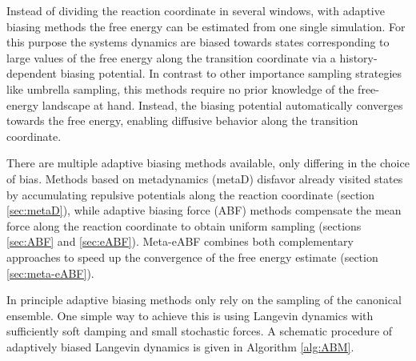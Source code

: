 Instead of dividing the reaction coordinate in several windows, with adaptive biasing methods the free energy can be estimated from one single simulation. For this purpose the systems dynamics are biased towards states corresponding to large values of the free energy along the transition coordinate via a history-dependent biasing potential. In contrast to other importance sampling strategies like umbrella sampling, this methods require no prior knowledge of the free-energy landscape at hand. Instead, the biasing potential automatically converges towards the free energy, enabling diffusive behavior along the transition coordinate.

There are multiple adaptive biasing methods available, only differing in the choice of bias. Methods based on metadynamics (metaD) disfavor already visited states by accumulating repulsive potentials along the reaction coordinate (section \ref{sec:metaD}), while adaptive biasing force (ABF) methods compensate the mean force along the reaction coordinate to obtain uniform sampling (sections \ref{sec:ABF} and \ref{sec:eABF}). Meta-eABF combines both complementary approaches to speed up the convergence of the free energy estimate (section \ref{sec:meta-eABF}).

In principle adaptive biasing methods only rely on the sampling of the canonical ensemble. One simple way to achieve this is using Langevin dynamics with sufficiently soft damping and small stochastic forces. A schematic procedure of adaptively biased Langevin dynamics is given in Algorithm \ref{alg:ABM}.

